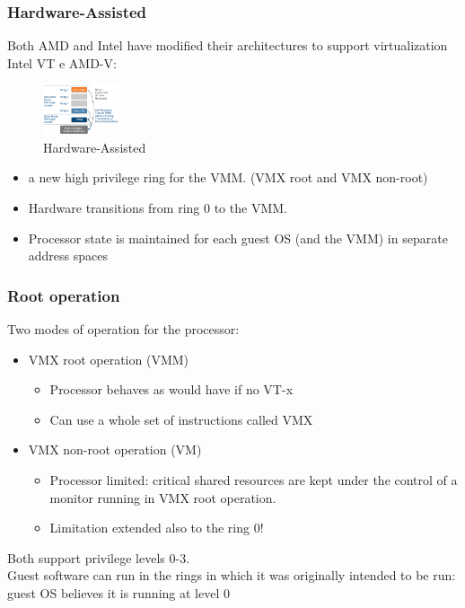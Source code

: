\documentclass[10pt, oneside]{article}
\begin{document}
\subsubsection{Hardware-Assisted}
Both AMD and Intel have modified their architectures to support virtualization Intel VT e AMD-V:\begin{multicols}{2}
    \begin{figure}[H]
        \begin{center}
        \includegraphics[width=0.2\textwidth]{img/img48.png}
        \caption{Hardware-Assisted}
        \label{fig:Hardware-Assisted}
        \end{center}
    \end{figure}\columnbreak
    \begin{itemize}
        \item a new high privilege ring for the VMM. (VMX root and VMX non-root)
        \item Hardware transitions from ring 0 to the VMM.
        \item Processor state is maintained
        for each guest OS (and the VMM) in separate
        address spaces
    \end{itemize}
\end{multicols}
\subsubsection{Root operation}
Two modes of operation for the processor:\begin{itemize}
    \item VMX root operation (VMM)\begin{itemize}
        \item Processor behaves as would have if no VT-x
        \item Can use a whole set of instructions called VMX
    \end{itemize}
    \item VMX non-root operation (VM)\begin{itemize}
        \item Processor limited: critical shared resources are kept under the control
        of a monitor running in VMX root operation.
        \item Limitation extended also to the ring 0!   
    \end{itemize}
\end{itemize}
Both support privilege levels 0-3.\\
Guest software can run in the rings in which it was originally intended to be run: guest OS believes it is running at level 0
\end{document}
